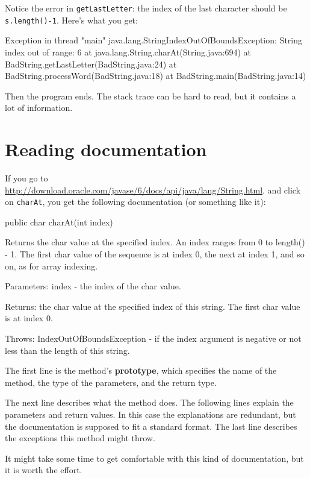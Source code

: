 Notice the error in {\tt getLastLetter}: the index of the last
character should be {\tt s.length()-1}.  Here's what you get:

\begin{verbatimtab}
Exception in thread "main" java.lang.StringIndexOutOfBoundsException:
String index out of range: 6
        at java.lang.String.charAt(String.java:694)
        at BadString.getLastLetter(BadString.java:24)
        at BadString.processWord(BadString.java:18)
        at BadString.main(BadString.java:14)
\end{verbatimtab}

Then the program ends.
The stack trace can be hard to read, but it contains a lot of information.


\section{Reading documentation}
\label{documentation}

If you go to
\url{http://download.oracle.com/javase/6/docs/api/java/lang/String.html}.
and click on {\tt charAt}, you get the following documentation
(or something like it):

\begin{verbatimtab}
public char charAt(int index)

Returns the char value at the specified index. An index ranges
from 0 to length() - 1. The first char value of the sequence is
at index 0, the next at index 1, and so on, as for array indexing.

Parameters: index - the index of the char value.

Returns: the char value at the specified index of this string.
  The first char value is at index 0.

Throws: IndexOutOfBoundsException - if the index argument is
  negative or not less than the length of this string.
\end{verbatimtab}

The first line is the method's {\bf prototype}, which specifies the
name of the method, the type of the parameters, and the return type.

The next line describes what the method does.  The following
lines explain the parameters and return values.  In this case
the explanations are redundant, but the documentation is
supposed to fit a standard format.  The last line describes
the exceptions this method might throw.

It might take some time to get
comfortable with this kind of documentation, but it is worth the effort.


